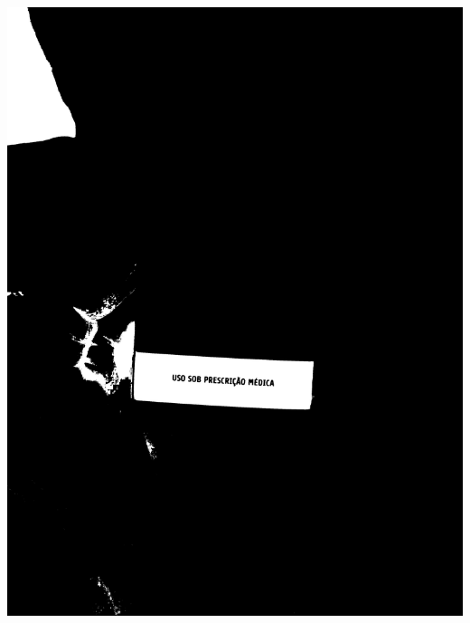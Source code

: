 \begin{frame}
\begin{columns}
\begin{column}{0.24\textwidth}
			\includegraphics[height=0.35\textheight]{../pictures/tysabri_cmyk_m_only_thresh.jpg}
			\\\vspace{\floatsep}

\end{column}
\end{columns}
\end{frame}

